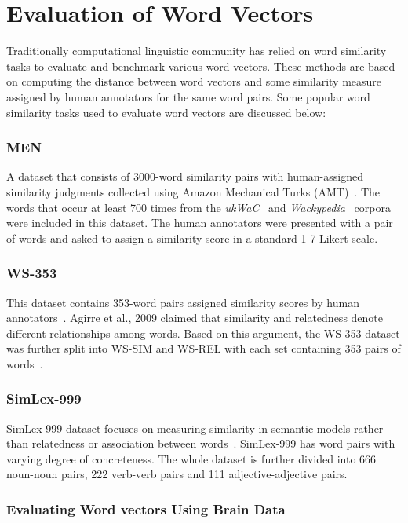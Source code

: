 
\section{Evaluation of Word Vectors}
Traditionally computational linguistic community has relied on word similarity tasks to evaluate and benchmark various word vectors. These methods are based on computing the distance between word vectors and some similarity measure assigned by human annotators for the same word pairs. Some popular word similarity tasks used to evaluate word vectors are discussed below:

\subsubsection{MEN} A dataset that consists of 3000-word similarity pairs with human-assigned similarity judgments collected using Amazon Mechanical Turks (AMT)~\cite{MEN}. The words that occur at least 700 times from the \textit{ukWaC}~\cite{ukWaC} and \textit{Wackypedia}~\cite{WaCky} corpora were included in this dataset. The human annotators were presented with a pair of words and asked to assign a similarity score in a standard 1-7 Likert scale.

\subsubsection{WS-353} This dataset contains 353-word pairs assigned similarity scores by human annotators~\cite{WS-353}. Agirre et al., 2009 claimed that similarity and relatedness denote different relationships among words. Based on this argument, the WS-353 dataset was further split into WS-SIM and WS-REL with each set containing 353 pairs of words~\cite{agirre2009study}.

\subsubsection{SimLex-999}

SimLex-999 dataset focuses on measuring similarity in semantic models rather than relatedness or association between words~\cite{hill2015simlex}.  SimLex-999 has word pairs with varying degree of concreteness. The whole dataset is further divided into 666 noun-noun pairs, 222 verb-verb pairs and 111 adjective-adjective pairs.



\subsubsection{Evaluating Word vectors Using Brain Data}

